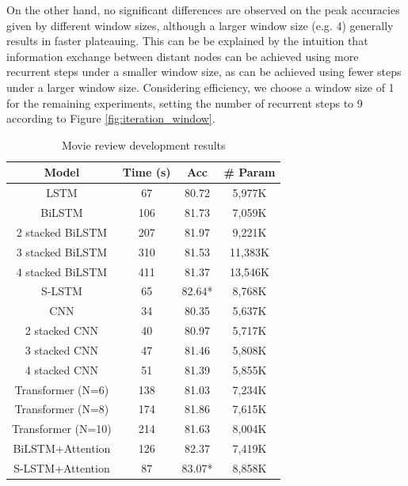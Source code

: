 \documentclass[11pt,a4paper]{article}
\begin{document}
On the other hand, no significant differences are observed on the peak accuracies given by different window sizes, although a larger window size (e.g. 4) generally results in faster plateauing. 
This can be be explained by the intuition that information exchange between distant nodes can be achieved using more recurrent steps under a smaller window size, as can be achieved using fewer steps under a larger window size.
Considering efficiency, we choose a window size of 1 for the remaining experiments, setting the number of recurrent steps to 9 according to Figure \ref{fig:iteration_window}.


\begin{table}[t]
	\centering
	\tabcolsep=0.1cm
	\begin{tabular}{|ccc|ccc|}
		\hline
		\multicolumn{3}{|c|}{\textbf{Model}}& \textbf{Time (s)} & \textbf{Acc} & \textbf{\# Param}\\ 
		\hline 	
		\multicolumn{3}{|c|}{LSTM}&67&80.72 &5,977K\\
		\multicolumn{3}{|c|}{BiLSTM}&106&81.73 &7,059K\\ 
		\multicolumn{3}{|c|}{2 stacked BiLSTM}&207&81.97&9,221K\\ 
		\multicolumn{3}{|c|}{3 stacked BiLSTM}&310&81.53 &11,383K\\
		\multicolumn{3}{|c|}{4 stacked BiLSTM}&411&81.37 &13,546K\\ 
		\multicolumn{3}{|c|}{S-LSTM}&65&82.64* &8,768K\\         
		\hline
		\multicolumn{3}{|c|}{CNN}&34&80.35&5,637K\\ 
        \multicolumn{3}{|c|}{2 stacked CNN}&40&80.97 &5,717K\\  
        \multicolumn{3}{|c|}{3 stacked CNN}&47&81.46 &5,808K\\  
        \multicolumn{3}{|c|}{4 stacked CNN}&51&81.39 &5,855K\\  
        \hline 	
		\multicolumn{3}{|c|}{Transformer (N=6)}&138&81.03&7,234K\\ 
        \multicolumn{3}{|c|}{Transformer (N=8)}&174&81.86 &7,615K\\  
        \multicolumn{3}{|c|}{Transformer (N=10)}&214&81.63 &8,004K\\  
		\hline 	
		\multicolumn{3}{|c|}{BiLSTM+Attention}&126&82.37 &7,419K\\
		\multicolumn{3}{|c|}{S-LSTM+Attention}&87&83.07* &8,858K\\
		\hline
	\end{tabular}
	\caption{\label{tab:movie_dev_2}Movie review development results}
\end{table}
\end{document}
